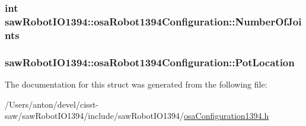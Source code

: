 \subsubsection[{Number\+Of\+Joints}]{\setlength{\rightskip}{0pt plus 5cm}int saw\+Robot\+I\+O1394\+::osa\+Robot1394\+Configuration\+::\+Number\+Of\+Joints}\label{structsaw_robot_i_o1394_1_1osa_robot1394_configuration_a8f20205cf84b097ff516024f84539171}
\hypertarget{structsaw_robot_i_o1394_1_1osa_robot1394_configuration_a5b38595afbffebafba80e01c0bea9bac}{}
\subsubsection[{Pot\+Location}]{ saw\+Robot\+I\+O1394\+::osa\+Robot1394\+Configuration\+::\+Pot\+Location}\label{structsaw_robot_i_o1394_1_1osa_robot1394_configuration_a5b38595afbffebafba80e01c0bea9bac}


The documentation for this struct was generated from the following file\+:\begin{DoxyCompactItemize}
\item 
/\+Users/anton/devel/cisst-\/saw/saw\+Robot\+I\+O1394/include/saw\+Robot\+I\+O1394/\hyperlink{osa_configuration1394_8h}{osa\+Configuration1394.\+h}\end{DoxyCompactItemize}

